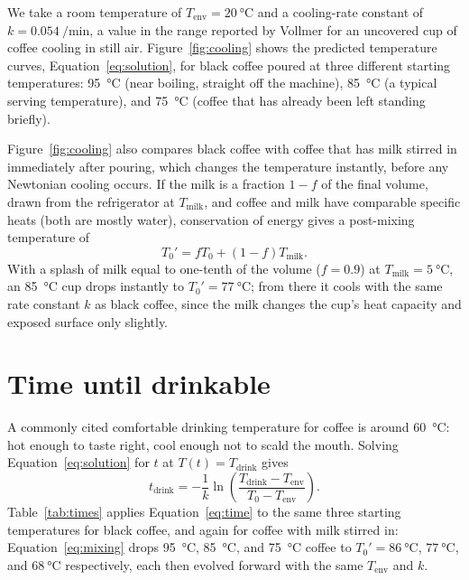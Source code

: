 \documentclass[11pt]{article}
\begin{document}
We take a room temperature of $T_{\text{env}} = \SI{20}{\celsius}$ and a
cooling-rate constant of $k = \SI{0.054}{\per\minute}$, a value in the
range reported by Vollmer \cite{vollmer2009} for an uncovered cup of coffee
cooling in still air. Figure~\ref{fig:cooling} shows the predicted
temperature curves, Equation~\eqref{eq:solution}, for black coffee poured
at three different starting temperatures: \SI{95}{\celsius} (near boiling,
straight off the machine), \SI{85}{\celsius} (a typical serving
temperature), and \SI{75}{\celsius} (coffee that has already been left
standing briefly).

Figure~\ref{fig:cooling} also compares black coffee with coffee that has
milk stirred in immediately after pouring, which changes the temperature
instantly, before any Newtonian cooling occurs. If the milk is a fraction
$1-f$ of the final volume, drawn from the refrigerator at
$T_{\text{milk}}$, and coffee and milk have comparable specific heats
(both are mostly water), conservation of energy gives a post-mixing
temperature of
\begin{equation}
  \label{eq:mixing}
  T_0' = f T_0 + (1-f) T_{\text{milk}}.
\end{equation}
With a splash of milk equal to one-tenth of the volume ($f = 0.9$) at
$T_{\text{milk}} = \SI{5}{\celsius}$, an \SI{85}{\celsius} cup drops
instantly to $T_0' = \SI{77}{\celsius}$; from there it cools with the
same rate constant $k$ as black coffee, since the milk changes the cup's
heat capacity and exposed surface only slightly.

\section{Time until drinkable}

A commonly cited comfortable drinking temperature for coffee is around
\SI{60}{\celsius}: hot enough to taste right, cool enough not to scald the
mouth. Solving Equation~\eqref{eq:solution} for $t$ at
$T(t) = T_{\text{drink}}$ gives
\begin{equation}
  \label{eq:time}
  t_{\text{drink}} = -\frac{1}{k}
    \ln\!\left(\frac{T_{\text{drink}} - T_{\text{env}}}{T_0 - T_{\text{env}}}\right).
\end{equation}
Table~\ref{tab:times} applies Equation~\eqref{eq:time} to the same three
starting temperatures for black coffee, and again for coffee with milk
stirred in: Equation~\eqref{eq:mixing} drops \SI{95}{\celsius},
\SI{85}{\celsius}, and \SI{75}{\celsius} coffee to $T_0' = \SI{86}{\celsius}$,
$\SI{77}{\celsius}$, and $\SI{68}{\celsius}$ respectively, each then
evolved forward with the same $T_{\text{env}}$ and $k$.
\end{document}

